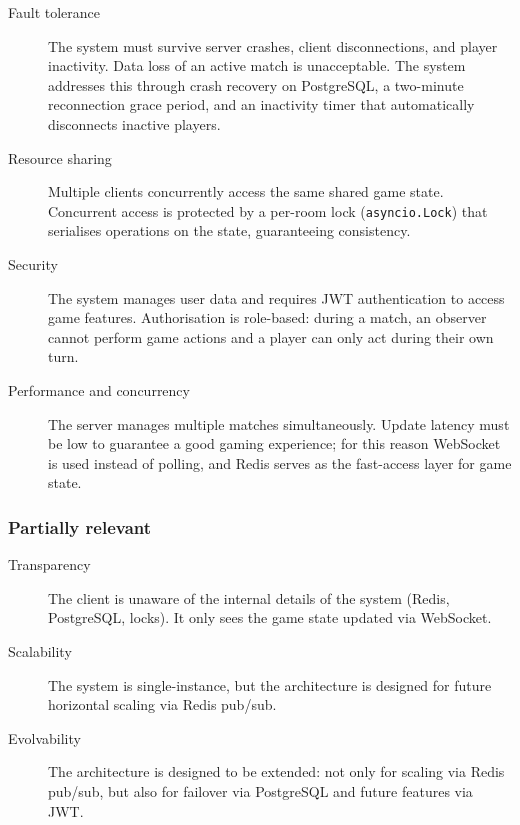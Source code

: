 \documentclass{scrartcl}
\begin{document}
\begin{description}
  \item[Fault tolerance] The system must survive server crashes, client disconnections,
  and player inactivity. Data loss of an active match is unacceptable.
  The system addresses this through crash recovery on PostgreSQL,
  a two-minute reconnection grace period,
  and an inactivity timer that automatically disconnects inactive players.

  \item[Resource sharing] Multiple clients concurrently access the same shared game state.
  Concurrent access is protected by a per-room lock (\texttt{asyncio.Lock})
  that serialises operations on the state, guaranteeing consistency.

  \item[Security] The system manages user data and requires JWT authentication
  to access game features.
  Authorisation is role-based: during a match, an observer cannot perform game actions
  and a player can only act during their own turn.

  \item[Performance and concurrency] The server manages multiple matches simultaneously.
  Update latency must be low to guarantee a good gaming experience;
  for this reason WebSocket is used instead of polling,
  and Redis serves as the fast-access layer for game state.
\end{description}

\subsubsection*{Partially relevant}

\begin{description}
  \item[Transparency] The client is unaware of the internal details of the system
  (Redis, PostgreSQL, locks). It only sees the game state updated via WebSocket.

  \item[Scalability] The system is single-instance, but the architecture is designed
  for future horizontal scaling via Redis pub/sub.

  \item[Evolvability] The architecture is designed to be extended:
  not only for scaling via Redis pub/sub,
  but also for failover via PostgreSQL and future features via JWT.
\end{description}
\end{document}
